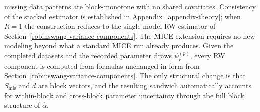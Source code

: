 missing data patterns are block-monotone with no shared covariates.
Consistency of the stacked estimator is established in
Appendix~\ref{appendix-theory}; when \(R=1\) the construction reduces
to the single-model RW estimator of
Section~\ref{robinswang-variance-components}.
The MICE extension requires no new modeling beyond what a standard MICE
run already produces.  Given the completed datasets and the recorded
parameter draws \(\psi_r^{(p)}\), every RW component is computed from
formulas unchanged in form from Section~\ref{robinswang-variance-components}.
The only structural change is that \(S_{\mathrm{mis}}\) and \(d\) are
block vectors, and the resulting sandwich automatically accounts for
within-block and cross-block parameter uncertainty through the full
block structure of \(\widehat\alpha\).